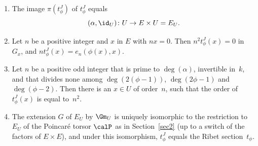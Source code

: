\skpt
\begin{Theorem}\label{thm:tJ}
\begin{enumerate}
\item\label{thm:tJ1} The image $\pi(t^J_\phi)$ of $t^J_\phi$ equals
\[
(\alpha,\id_U)\colon U\to E\times U = E_U.
\]
\item\label{thm:tJ2} Let $n$ be a positive integer and $x$ in $E$ with $nx=0$.
Then $n^2t^J_\phi(x)=0$ in~$G_x$, and $nt^J_\phi(x) = e_n(\phi(x),x)$.
\item\label{thm:tJ3} Let $n$ be a positive odd integer that is prime to
$\deg(\alpha)$, invertible in~$k$, and that divides none among
$\deg(2(\phi-1))$, $\deg(2\phi-1)$ and $\deg(\phi-2)$. Then there is
an $x\in U$ of order~$n$, such that the order of $t^J_\phi(x)$ is
equal to~$n^2$.
\item\label{thm:tJ4} The extension $G$ of $E_U$ by ${\Gm}_U$ is uniquely isomorphic
to the restriction to $E_U$ of the Poincaré torsor $\calP$ as in
Section~\ref{sec2} (up to a switch of the factors of $E \times E$),
and under this isomorphism, $t^J_\phi$ equals the Ribet
section~$t_\phi$.
\end{enumerate}
\end{Theorem}
